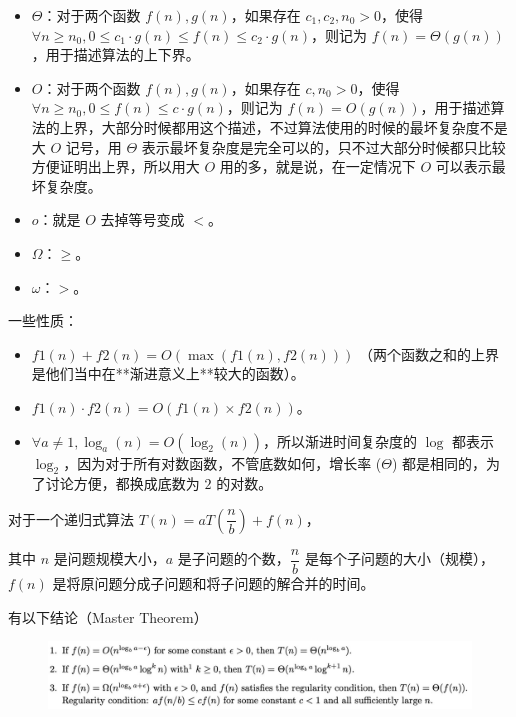 \documentclass[titlepage, a4paper]{article}
\begin{document}
\begin{multicols}{2}
\begin{spacing}{0.6}
			 		\begin{itemize}
			 			\item $\Theta$：对于两个函数 $f(n), g(n)$，如果存在 $c_1,c_2,n_0 > 0$，使得 $\forall n\ge n_0, 0 \le c_1 \cdot g(n) \le f(n) \le c_2 \cdot g(n)$，则记为 $f(n) = \Theta(g(n))$，用于描述算法的上下界。
			 			\item  $O$：对于两个函数 $f(n), g(n)$，如果存在 $c, n_0 > 0$，使得 $\forall n\ge n_0,0 \le f(n) \le c \cdot g(n)$，则记为 $f(n) = O(g(n))$，用于描述算法的上界，大部分时候都用这个描述，不过算法使用的时候的最坏复杂度不是大 $O$ 记号，用 $\Theta$ 表示最坏复杂度是完全可以的，只不过大部分时候都只比较方便证明出上界，所以用大 $O$ 用的多，就是说，在一定情况下 $O$ 可以表示最坏复杂度。
			 			\item $o$：就是 $O$ 去掉等号变成 $<$。
			 			\item $\Omega$：$\ge$。
			 			\item $\omega$：$>$。
			 		\end{itemize}
		 		
			 		一些性质：
			 		\begin{itemize}
			 			\item $f1(n) + f2(n) = O(\max(f1(n), f2(n)))$ （两个函数之和的上界是他们当中在**渐进意义上**较大的函数）。
			 			\item $f1(n)\cdot f2(n) = O(f1(n) \times f2(n))$。
			 			\item $\forall a \not=1, \log_a(n) = O(\log_2(n))$，所以渐进时间复杂度的 $\log$ 都表示 $\log_2$，因为对于所有对数函数，不管底数如何，增长率 ($\Theta$) 都是相同的，为了讨论方便，都换成底数为 $2$ 的对数。
				 	\end{itemize}
			 	
			 		对于一个递归式算法 $T(n) = aT(\dfrac{n}{b}) + f(n)$，
			 		
			 		其中 $n$ 是问题规模大小，$a$ 是子问题的个数，$\dfrac{n}{b}$ 是每个子问题的大小（规模），$f(n)$ 是将原问题分成子问题和将子问题的解合并的时间。
			 		
			 		有以下结论（Master Theorem）
			 		
			 		\begin{figure}[H]
			 			\centering
			 			\includegraphics[scale=0.39]{src/Basic/tc-1.jpg}
			 		\end{figure}
			 		

\end{spacing}
\end{multicols}
\end{document}
